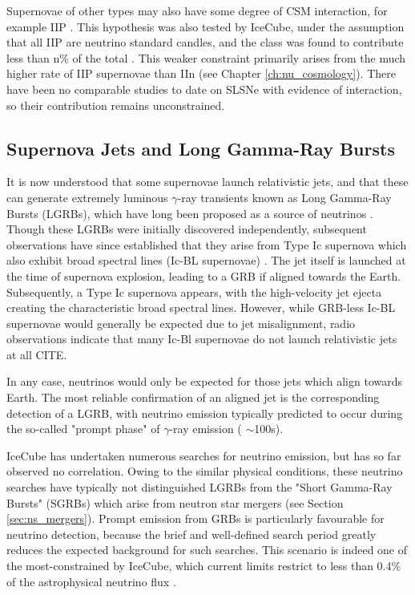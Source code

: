 Supernovae of other types may also have some degree of CSM interaction, for example IIP . This hypothesis was also tested by IceCube, under the assumption that all IIP are neutrino standard candles, and the class was found to contribute less than n\% of the total \cite{Stasik2018Search}. This weaker constraint primarily arises from the much higher rate of IIP supernovae than IIn (see Chapter \ref{ch:nu_cosmology}). There have been no comparable studies to date on SLSNe with evidence of interaction, so their contribution remains unconstrained.

\subsection{Supernova Jets and Long Gamma-Ray Bursts}

It is now understood that some supernovae launch relativistic jets, and that these can generate extremely luminous $\gamma$-ray transients known as Long Gamma-Ray Bursts (LGRBs), which have long been proposed as a source of neutrinos . Though these LGRBs were initially discovered independently, subsequent observations have since established that they arise from Type Ic supernova which also exhibit broad spectral lines (Ic-BL supernovae) . The jet itself is launched at the time of supernova explosion, leading to a GRB if aligned towards the Earth. Subsequently, a Type Ic supernova appears, with the high-velocity jet ejecta creating the characteristic broad spectral lines. However, while GRB-less Ic-BL supernovae would generally be expected due to jet misalignment, radio observations indicate that many Ic-Bl supernovae do not launch relativistic jets at all CITE.

In any case, neutrinos would only be expected for those jets which align towards Earth. The most reliable confirmation of an aligned jet is the corresponding detection of a LGRB, with neutrino emission typically predicted to occur during the so-called "prompt phase" of $\gamma$-ray emission ( $\sim$100s). 

IceCube has undertaken numerous searches for neutrino emission, but has so far observed no correlation. Owing to the similar physical conditions, these neutrino searches have typically not distinguished LGRBs from the "Short Gamma-Ray Bursts" (SGRBs) which arise from neutron star mergers (see Section \ref{sec:ns_mergers}). Prompt emission from GRBs is particularly favourable for neutrino detection, because the brief and well-defined search period greatly reduces the expected background for such searches. This scenario is indeed one of the most-constrained by IceCube, which current limits restrict to less than 0.4\% of the astrophysical neutrino flux . 

